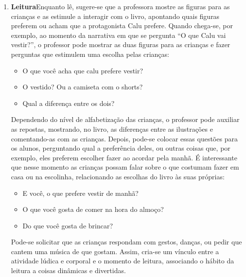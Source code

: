 \documentclass[11pt]{extarticle}
\begin{document}
\begin{enumerate}
\item \textbf{Leitura}\quad Enquanto lê, sugere-se que a professora mostre as figuras para as crianças e as estimule a interagir com o livro, apontando quais figuras preferem ou acham que a protagonista Calu prefere. Quando chega-se, por exemplo, ao momento da narrativa em que se pergunta ``O que Calu vai vestir?'', o professor pode mostrar as duas figuras para as crianças e fazer perguntas que estimulem uma escolha pelas crianças:

\begin{itemize}
\item O que você acha que calu prefere vestir?
\item O vestido? Ou a camiseta com o shorts?
\item Qual a diferença entre os dois?
\end{itemize}

Dependendo do nível de alfabetização das crianças, o professor pode auxiliar as repostas, mostrando, no livro, as diferenças entre as ilustrações e comentando-as com as crianças.
Depois, pode-se colocar essas questões para os alunos, perguntando qual a preferência deles, ou outras coisas que, por exemplo, eles preferem escolher fazer ao acordar pela manhã.
É interessante que nesse momento as crianças possam falar sobre o que costumam fazer em casa ou na escolinha, relacionando as escolhas do livro às suas próprias:

\begin{itemize}
\item E você, o que prefere vestir de manhã?
\item O que você gosta de comer na hora do almoço?
\item Do que você gosta de brincar?
\end{itemize}




Pode-se solicitar que as crianças respondam com gestos, danças, ou pedir que cantem uma música de que gostam. Assim, cria-se um vínculo entre a atividade lúdica e corporal e o momento de leitura, associando o hábito da leitura a coisas dinâmicas e divertidas.




\end{enumerate}
\end{document}
